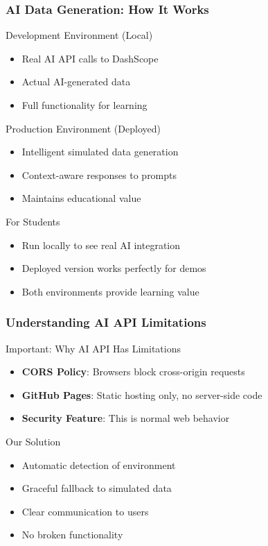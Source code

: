 \documentclass[aspectratio=169]{beamer}
\begin{document}
\begin{frame}
\frametitle{AI Data Generation: How It Works}
\begin{alertblock}{Development Environment (Local)}
\begin{itemize}
\item Real AI API calls to DashScope
\item Actual AI-generated data
\item Full functionality for learning
\end{itemize}
\end{alertblock}

\begin{exampleblock}{Production Environment (Deployed)}
\begin{itemize}
\item Intelligent simulated data generation
\item Context-aware responses to prompts
\item Maintains educational value
\end{itemize}
\end{exampleblock}

\begin{alertblock}{For Students}
\begin{itemize}
\item Run locally to see real AI integration
\item Deployed version works perfectly for demos
\item Both environments provide learning value
\end{itemize}
\end{alertblock}
\end{frame}

\begin{frame}
\frametitle{Understanding AI API Limitations}
\begin{alertblock}{Important: Why AI API Has Limitations}
\begin{itemize}
\item \textbf{CORS Policy}: Browsers block cross-origin requests
\item \textbf{GitHub Pages}: Static hosting only, no server-side code
\item \textbf{Security Feature}: This is normal web behavior
\end{itemize}
\end{alertblock}

\begin{exampleblock}{Our Solution}
\begin{itemize}
\item Automatic detection of environment
\item Graceful fallback to simulated data
\item Clear communication to users
\item No broken functionality
\end{itemize}
\end{exampleblock}
\end{frame}
\end{document}
